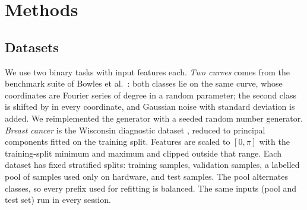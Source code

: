 \section{Methods}
\label{sec:methods}

\subsection{Datasets}
We use two binary tasks with  input features each. \emph{Two curves} comes from
the benchmark suite of Bowles et al.~\cite{bowles2024benchmarking}: both classes lie on the same
curve, whose coordinates are Fourier series of degree  in a random parameter;
the second class is shifted by  in every coordinate, and Gaussian noise with
standard deviation  is added. We reimplemented the generator with a seeded random
number generator. \emph{Breast cancer} is the Wisconsin diagnostic dataset
\cite{wolberg1993breast}, reduced to  principal components fitted on the training
split. Features are scaled to $[0,\pi]$ with the training-split minimum and maximum and clipped
outside that range. Each dataset has fixed stratified splits:  training samples,
 validation samples, a labelled pool of  samples used only on hardware, and
 test samples. The pool alternates classes, so every prefix used for refitting is
balanced. The same  inputs (pool and test set) run in every session.

